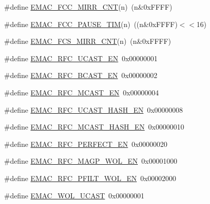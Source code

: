 \begin{DoxyCompactItemize}
\item 
\#define \hyperlink{group___e_m_a_c___private___macros_ga7b3cd63661f8fa945006b41c4a9cd73c}{\-E\-M\-A\-C\-\_\-\-F\-C\-C\-\_\-\-M\-I\-R\-R\-\_\-\-C\-N\-T}(n)~(n\&0x\-F\-F\-F\-F)
\item 
\#define \hyperlink{group___e_m_a_c___private___macros_ga52788b23a5d2ca983283a2bf2f0f1173}{\-E\-M\-A\-C\-\_\-\-F\-C\-C\-\_\-\-P\-A\-U\-S\-E\-\_\-\-T\-I\-M}(n)~((n\&0x\-F\-F\-F\-F)$<$$<$16)
\item 
\#define \hyperlink{group___e_m_a_c___private___macros_gaf08ee487659939fc03bd89c3efe60b43}{\-E\-M\-A\-C\-\_\-\-F\-C\-S\-\_\-\-M\-I\-R\-R\-\_\-\-C\-N\-T}(n)~(n\&0x\-F\-F\-F\-F)
\item 
\#define \hyperlink{group___e_m_a_c___private___macros_ga687eb75f5daa61e9b15045d34235785e}{\-E\-M\-A\-C\-\_\-\-R\-F\-C\-\_\-\-U\-C\-A\-S\-T\-\_\-\-E\-N}~0x00000001
\item 
\#define \hyperlink{group___e_m_a_c___private___macros_gafcba0f7bdf969c3a9e749ddb008ac642}{\-E\-M\-A\-C\-\_\-\-R\-F\-C\-\_\-\-B\-C\-A\-S\-T\-\_\-\-E\-N}~0x00000002
\item 
\#define \hyperlink{group___e_m_a_c___private___macros_gac539fa2b807fb287d6c198eb8bc3b21c}{\-E\-M\-A\-C\-\_\-\-R\-F\-C\-\_\-\-M\-C\-A\-S\-T\-\_\-\-E\-N}~0x00000004
\item 
\#define \hyperlink{group___e_m_a_c___private___macros_ga97ccefbc8c2d1b325403f620cb0a8d1d}{\-E\-M\-A\-C\-\_\-\-R\-F\-C\-\_\-\-U\-C\-A\-S\-T\-\_\-\-H\-A\-S\-H\-\_\-\-E\-N}~0x00000008
\item 
\#define \hyperlink{group___e_m_a_c___private___macros_ga280fa62dca942c95175700518d29ed9d}{\-E\-M\-A\-C\-\_\-\-R\-F\-C\-\_\-\-M\-C\-A\-S\-T\-\_\-\-H\-A\-S\-H\-\_\-\-E\-N}~0x00000010
\item 
\#define \hyperlink{group___e_m_a_c___private___macros_gaade7aa3af3dfb494f119421ff24cb073}{\-E\-M\-A\-C\-\_\-\-R\-F\-C\-\_\-\-P\-E\-R\-F\-E\-C\-T\-\_\-\-E\-N}~0x00000020
\item 
\#define \hyperlink{group___e_m_a_c___private___macros_ga7c8e91225fe68cc5a4d0d053dc23b430}{\-E\-M\-A\-C\-\_\-\-R\-F\-C\-\_\-\-M\-A\-G\-P\-\_\-\-W\-O\-L\-\_\-\-E\-N}~0x00001000
\item 
\#define \hyperlink{group___e_m_a_c___private___macros_gaeedc1a6034b746ac63f7b12726b84d16}{\-E\-M\-A\-C\-\_\-\-R\-F\-C\-\_\-\-P\-F\-I\-L\-T\-\_\-\-W\-O\-L\-\_\-\-E\-N}~0x00002000
\item 
\#define \hyperlink{group___e_m_a_c___private___macros_ga6be87dee67b2d007de918c6203954000}{\-E\-M\-A\-C\-\_\-\-W\-O\-L\-\_\-\-U\-C\-A\-S\-T}~0x00000001
$$
\end{DoxyCompactItemize}
